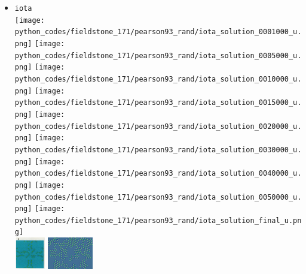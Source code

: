 \begin{itemize}
\item {\tt iota}\\
\texttt{[image: python\_codes/fieldstone\_171/pearson93\_rand/iota\_solution\_0001000\_u.png]}
\texttt{[image: python\_codes/fieldstone\_171/pearson93\_rand/iota\_solution\_0005000\_u.png]}
\texttt{[image: python\_codes/fieldstone\_171/pearson93\_rand/iota\_solution\_0010000\_u.png]}
\texttt{[image: python\_codes/fieldstone\_171/pearson93\_rand/iota\_solution\_0015000\_u.png]}
\texttt{[image: python\_codes/fieldstone\_171/pearson93\_rand/iota\_solution\_0020000\_u.png]}
\texttt{[image: python\_codes/fieldstone\_171/pearson93\_rand/iota\_solution\_0030000\_u.png]}
\texttt{[image: python\_codes/fieldstone\_171/pearson93\_rand/iota\_solution\_0040000\_u.png]}
\texttt{[image: python\_codes/fieldstone\_171/pearson93\_rand/iota\_solution\_0050000\_u.png]}
\texttt{[image: python\_codes/fieldstone\_171/pearson93\_rand/iota\_solution\_final\_u.png]}\\
\includegraphics[height=1.4cm]{python_codes/fieldstone_171/images/pear93_iota}
\includegraphics[height=1.4cm]{python_codes/fieldstone_171/images/munafo_iota}



\end{itemize}
